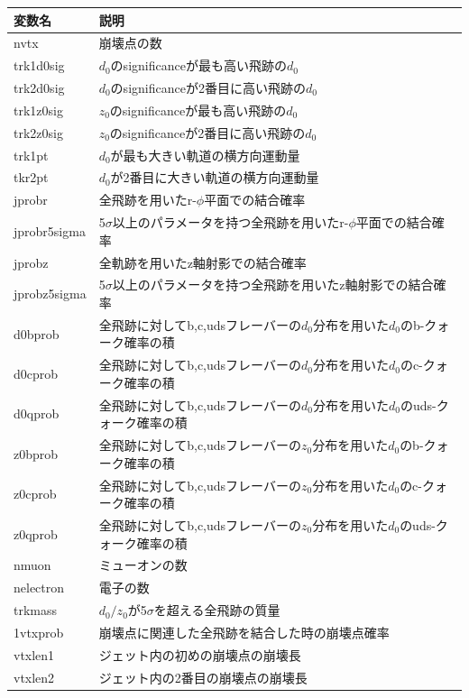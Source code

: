 \begin{table}[H]
 \centering
 \small
  \begin{tabular}{ l | l }
   \hline
   変数名 & 説明\\
   \hline \hline
   nvtx & 崩壊点の数\\
   trk1d0sig & $d_0$のsignificanceが最も高い飛跡の$d_0$\\
   trk2d0sig & $d_0$のsignificanceが2番目に高い飛跡の$d_0$\\
   trk1z0sig & $z_0$のsignificanceが最も高い飛跡の$d_0$\\
   trk2z0sig & $z_0$のsignificanceが2番目に高い飛跡の$d_0$\\
   trk1pt & $d_0$が最も大きい軌道の横方向運動量\\
   tkr2pt & $d_0$が2番目に大きい軌道の横方向運動量\\
   jprobr & 全飛跡を用いたr-$\phi$平面での結合確率\\
   jprobr5sigma & 5$\sigma$以上のパラメータを持つ全飛跡を用いたr-$\phi$平面での結合確率\\
   jprobz & 全軌跡を用いたz軸射影での結合確率\\
   jprobz5sigma & 5$\sigma$以上のパラメータを持つ全飛跡を用いたz軸射影での結合確率\\
   d0bprob & 全飛跡に対してb,c,udsフレーバーの$d_0$分布を用いた$d_0$のb-クォーク確率の積\\
   d0cprob & 全飛跡に対してb,c,udsフレーバーの$d_0$分布を用いた$d_0$のc-クォーク確率の積\\
   d0qprob & 全飛跡に対してb,c,udsフレーバーの$d_0$分布を用いた$d_0$のuds-クォーク確率の積\\
   z0bprob & 全飛跡に対してb,c,udsフレーバーの$z_0$分布を用いた$d_0$のb-クォーク確率の積\\
   z0cprob & 全飛跡に対してb,c,udsフレーバーの$z_0$分布を用いた$d_0$のc-クォーク確率の積\\
   z0qprob & 全飛跡に対してb,c,udsフレーバーの$z_0$分布を用いた$d_0$のuds-クォーク確率の積\\
   nmuon & ミューオンの数\\
   nelectron & 電子の数\\
   trkmass & $d_0/z_0$が5$\sigma$を超える全飛跡の質量\\
   1vtxprob & 崩壊点に関連した全飛跡を結合した時の崩壊点確率\\
   vtxlen1 & ジェット内の初めの崩壊点の崩壊長\\
   vtxlen2 & ジェット内の2番目の崩壊点の崩壊長\\

\end{tabular}
\end{table}

